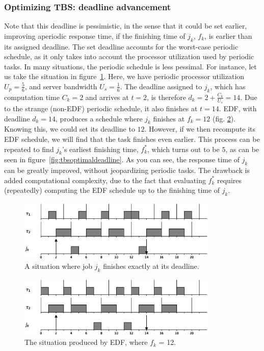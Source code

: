 \subsubsection{Optimizing TBS: deadline advancement}
Note that this deadline is pessimistic, in the sense that it could be set earlier, improving aperiodic response time, if the finishing time of $j_k$, $f_k$, is earlier than its assigned deadline. The set deadline accounts for the worst-case periodic schedule, as it only takes into account the processor utilization used by periodic tasks. In many situations, the periodic schedule is less pessimal. For instance, let us take the situation in figure~\ref{fig:tbsworstdeadline}. Here, we have periodic processor utilization $U_p = \frac{5}{6}$, and server bandwidth $U_s = \frac{1}{6}$. The deadline assigned to $j_k$, which has computation time $C_k = 2$ and arrives at $t = 2$, is therefore $d_k = 2 + \frac{C_k}{U_s} = 14$. Due to the strange (non-EDF) periodic schedule, it also finishes at $t = 14$. EDF, with deadline $d_k = 14$, produces a schedule where $j_k$ finishes at $f_k = 12$ (fig. \ref{fig:tbsedfdeadline}). Knowing this, we could set its deadline to $12$. However, if we then recompute its EDF schedule, we will find that the task finishes even earlier. This process can be repeated to find $j_k$'s earliest finishing time, $f^*_k$, which turns out to be $5$, as can be seen in figure~\ref{fig:tbsoptimaldeadline}. As you can see, the response time of $j_k$ can be greatly improved, without jeopardizing periodic tasks. The drawback is added computational complexity, due to the fact that evaluating $f^*_k$ requires (repeatedly) computing the EDF schedule up to the finishing time of $j_k$.

\begin{figure}[htpb]
    \centering
    \includegraphics[width=0.85\textwidth]{figures/worstcasedeadline.eps}
    \caption{A situation where job $j_k$ finishes exactly at its deadline.}
    \label{fig:tbsworstdeadline}
\end{figure}

\begin{figure}[htpb]
    \centering
    \includegraphics[width=0.85\textwidth]{figures/edfdeadline.eps}
    \caption{The situation produced by EDF, where $f_k$ = 12.}
    \label{fig:tbsedfdeadline}
\end{figure}

